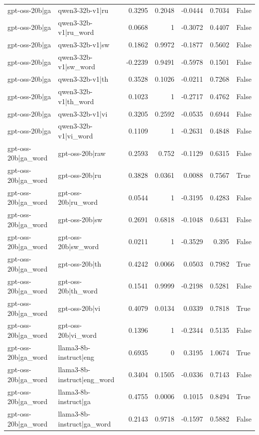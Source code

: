 \begin{table}
\begin{tabular}{l l r r r r l}
gpt-oss-20b|ga & qwen3-32b-v1|ru & 0.3295 & 0.2048 & -0.0444 & 0.7034 & False \\
gpt-oss-20b|ga & qwen3-32b-v1|ru_word & 0.0668 & 1 & -0.3072 & 0.4407 & False \\
gpt-oss-20b|ga & qwen3-32b-v1|sw & 0.1862 & 0.9972 & -0.1877 & 0.5602 & False \\
gpt-oss-20b|ga & qwen3-32b-v1|sw_word & -0.2239 & 0.9491 & -0.5978 & 0.1501 & False \\
gpt-oss-20b|ga & qwen3-32b-v1|th & 0.3528 & 0.1026 & -0.0211 & 0.7268 & False \\
gpt-oss-20b|ga & qwen3-32b-v1|th_word & 0.1023 & 1 & -0.2717 & 0.4762 & False \\
gpt-oss-20b|ga & qwen3-32b-v1|vi & 0.3205 & 0.2592 & -0.0535 & 0.6944 & False \\
gpt-oss-20b|ga & qwen3-32b-v1|vi_word & 0.1109 & 1 & -0.2631 & 0.4848 & False \\
gpt-oss-20b|ga_word & gpt-oss-20b|raw & 0.2593 & 0.752 & -0.1129 & 0.6315 & False \\
gpt-oss-20b|ga_word & gpt-oss-20b|ru & 0.3828 & 0.0361 & 0.0088 & 0.7567 & True \\
gpt-oss-20b|ga_word & gpt-oss-20b|ru_word & 0.0544 & 1 & -0.3195 & 0.4283 & False \\
gpt-oss-20b|ga_word & gpt-oss-20b|sw & 0.2691 & 0.6818 & -0.1048 & 0.6431 & False \\
gpt-oss-20b|ga_word & gpt-oss-20b|sw_word & 0.0211 & 1 & -0.3529 & 0.395 & False \\
gpt-oss-20b|ga_word & gpt-oss-20b|th & 0.4242 & 0.0066 & 0.0503 & 0.7982 & True \\
gpt-oss-20b|ga_word & gpt-oss-20b|th_word & 0.1541 & 0.9999 & -0.2198 & 0.5281 & False \\
gpt-oss-20b|ga_word & gpt-oss-20b|vi & 0.4079 & 0.0134 & 0.0339 & 0.7818 & True \\
gpt-oss-20b|ga_word & gpt-oss-20b|vi_word & 0.1396 & 1 & -0.2344 & 0.5135 & False \\
gpt-oss-20b|ga_word & llama3-8b-instruct|eng & 0.6935 & 0 & 0.3195 & 1.0674 & True \\
gpt-oss-20b|ga_word & llama3-8b-instruct|eng_word & 0.3404 & 0.1505 & -0.0336 & 0.7143 & False \\
gpt-oss-20b|ga_word & llama3-8b-instruct|ga & 0.4755 & 0.0006 & 0.1015 & 0.8494 & True \\
gpt-oss-20b|ga_word & llama3-8b-instruct|ga_word & 0.2143 & 0.9718 & -0.1597 & 0.5882 & False \\

\end{tabular}
\end{table}

